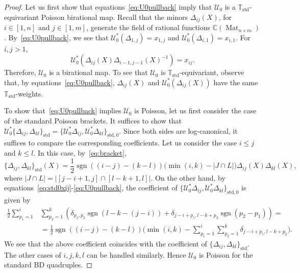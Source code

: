\documentclass[11pt]{article}
\newcommand{\std}{\mathrm{std}}
\DeclareMathOperator{\Mat}{Mat}
\DeclareMathOperator{\sgn}{sgn}
\theoremstyle{definition}\newtheorem{definition}[theorem]{Definition}
\theoremstyle{definition}\newtheorem{remark}[theorem]{Remark}
\theoremstyle{remark}
\numberwithin{equation}{section}
\begin{document}
\begin{proof}
    Let us first show that equations~\eqref{eq:U0pullback} imply that $\mathcal{U}_0$ is a $\mathbb{T}_{\std}$-equivariant Poisson birational map. Recall that the minors $\Delta_{ij}(X)$, for $i\in [1,n]$ and $j \in [1,m]$, generate the field of rational functions $\mathbb{C}(\Mat_{n\times m})$. By~\eqref{eq:U0pullback}, we see that $\mathcal{U}_0^*(\Delta_{1,j}) = x_{1,j}$ and $\mathcal{U}_0^*(\Delta_{i,1}) = x_{i,1}$. For $i,j>1$, 
    \begin{equation*}
        \mathcal{U}_0^*(\Delta_{ij}(X) \Delta_{i-1,j-1}(X)^{-1}) = x_{ij}.
    \end{equation*}
    Therefore, $\mathcal{U}_0$ is a birational map. To see that $\mathcal{U}_0$ is $\mathbb{T}_{\std}$-equivariant, observe that, by equations~\eqref{eq:U0pullback}, $\Delta_{ij}(X)$ and $\mathcal{U}_0^*(\Delta_{ij}(X))$ have the same $\mathbb{T}_{\std}$-weights.

    To show that~\eqref{eq:U0pullback} implies $\mathcal{U}_0$ is Poisson, let us first consider the case of the standard Poisson brackets. It suffices to show that $\mathcal{U}_0^*\{\Delta_{ij},\Delta_{kl}\}_{\std} = \{\mathcal{U}_0^*\Delta_{ij},\mathcal{U}_0^*\Delta_{kl}\}_{\std,0}$. Since both sides are log-canonical, it suffices to compare the corresponding coefficients. Let us consider the case $i\leq j$ and $k \leq l$. In this case, by~\eqref{eq:bracket},
    \begin{equation*}
        \{\Delta_{ij},\Delta_{kl}\}_{\std}(X) = \frac{1}{2}\sgn((i-j)-(k-l))\big(\min(i,k)-|J \cap L|\big)\Delta_{ij}(X)\Delta_{kl}(X),
    \end{equation*}
    where $|J \cap L| = |[j-i+1,j]\cap [l-k+1,l]|$.
    On the other hand, by equations~\eqref{eq:std0xij}-\eqref{eq:U0pullback}, the coefficient of $\{\mathcal{U}_0^*\Delta_{ij},\mathcal{U}_0^*\Delta_{kl}\}_{\std,0}$ is given by
    \begin{equation*}\begin{split}
         \frac{1}{2}\sum_{p_1=1}^i& \sum_{p_2=1}^k (\delta_{p_1,p_2}\sgn(l-k-(j-i))+\delta_{j-i+p_1,l-k+p_2}\sgn(p_2-p_1)) = \\ &= \frac{1}{2}\sgn((i-j)-(k-l))\big( \min(i,k) - \sum_{p_1=1}^i \sum_{p_2=1}^k \delta_{j-i+p_1,l-k+p_2}\big).
         \end{split}
    \end{equation*}
    We see that the above coefficient coincides with the coefficient of $\{\Delta_{ij},\Delta_{kl}\}_{\std}$. The other cases of $i,j,k,l$ can be handled similarly. Hence $\mathcal{U}_0$ is Poisson for the standard BD quadruples. 


\end{proof}
\end{document}
